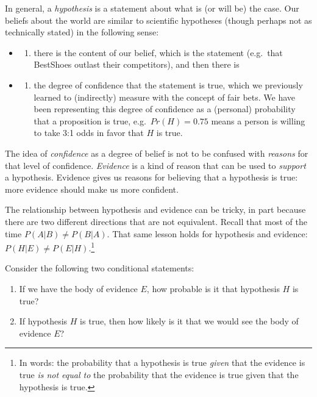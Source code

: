 \documentclass[]{tufte-book}
\providecommand{\tightlist}{%
  \setlength{\itemsep}{0pt}\setlength{\parskip}{0pt}}
\begin{document}
In general, a \emph{hypothesis} is a statement about what is (or will be) the case. Our beliefs about the world are similar to scientific hypotheses (though perhaps not as technically stated) in the following sense:

\begin{itemize}
\item
  \begin{enumerate}
  \def\labelenumi{\roman{enumi})}
  \tightlist
  \item
    there is the content of our belief, which is the statement (e.g.~that BestShoes outlast their competitors), and then there is
  \end{enumerate}
\item
  \begin{enumerate}
  \def\labelenumi{\roman{enumi})}
  \setcounter{enumi}{1}
  \tightlist
  \item
    the degree of confidence that the statement is true, which we previously learned to (indirectly) measure with the concept of fair bets. We have been representing this degree of confidence as a (personal) probability that a proposition is true, e.g.~\(Pr(H)=0.75\) means a person is willing to take 3:1 odds in favor that \(H\) is true.
  \end{enumerate}
\end{itemize}

The idea of \emph{confidence} as a degree of belief is not to be confused with \emph{reasons} for that level of confidence. \emph{Evidence} is a kind of reason that can be used to \emph{support} a hypothesis. Evidence gives us reasons for believing that a hypothesis is true: more evidence should make us more confident.

The relationship between hypothesis and evidence can be tricky, in part because there are two different directions that are not equivalent. Recall that most of the time \(P(A|B)\neq P(B|A)\). That same lesson holds for hypothesis and evidence: \(P(H|E)\neq P(E|H)\).\footnote{In words: the probability that a hypothesis is true \emph{given} that the evidence is true \emph{is not equal to} the probability that the evidence is true given that the hypothesis is true.}

Consider the following two conditional statements:

\begin{enumerate}
\def\labelenumi{\arabic{enumi}.}
\tightlist
\item
  If we have the body of evidence \(E\), how probable is it that hypothesis \(H\) is true?
\item
  If hypothesis \(H\) is true, then how likely is it that we would see the body of evidence \(E\)?
\end{enumerate}
\end{document}
